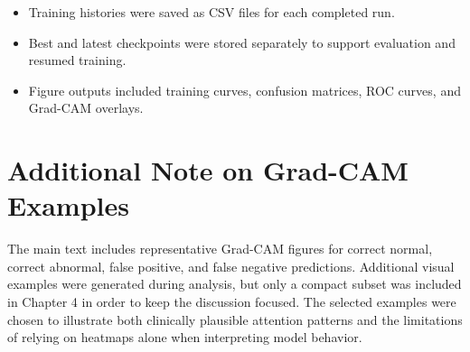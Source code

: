 \begin{itemize}
    \item Training histories were saved as CSV files for each completed run.
    \item Best and latest checkpoints were stored separately to support evaluation and resumed training.
    \item Figure outputs included training curves, confusion matrices, ROC curves, and Grad-CAM overlays.
\end{itemize}

\section{Additional Note on Grad-CAM Examples}
The main text includes representative Grad-CAM figures for correct normal, correct abnormal, false positive, and false negative predictions. Additional visual examples were generated during analysis, but only a compact subset was included in Chapter 4 in order to keep the discussion focused. The selected examples were chosen to illustrate both clinically plausible attention patterns and the limitations of relying on heatmaps alone when interpreting model behavior.
